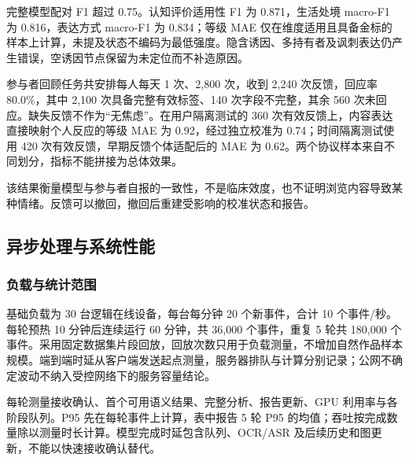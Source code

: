 完整模型配对 F1 超过 0.75。认知评价适用性 F1 为 0.871，生活处境 macro-F1 为 0.816，表达方式 macro-F1 为 0.834；等级 MAE 仅在维度适用且具备金标的样本上计算，未提及状态不编码为最低强度。隐含诱因、多持有者及讽刺表达仍产生错误，空诱因节点保留为未定位而不补造原因。

参与者回顾任务共安排每人每天 1 次、2,800 次，收到 2,240 次反馈，回应率 80.0\%，其中 2,100 次具备完整有效标签、140 次字段不完整，其余 560 次未回应。缺失反馈不作为``无焦虑''。在用户隔离测试的 360 次有效反馈上，内容表达直接映射个人反应的等级 MAE 为 0.92，经过独立校准为 0.74；时间隔离测试使用 420 次有效反馈，早期反馈个体适配后的 MAE 为 0.62。两个协议样本来自不同划分，指标不能拼接为总体效果。

该结果衡量模型与参与者自报的一致性，不是临床效度，也不证明浏览内容导致某种情绪。反馈可以撤回，撤回后重建受影响的校准状态和报告。

\subsection{异步处理与系统性能}\label{section:3.8}

\subsubsection{负载与统计范围}\label{section:3.8.1}

基础负载为 30 台逻辑在线设备，每台每分钟 20 个新事件，合计 10 个事件/秒。每轮预热 10 分钟后连续运行 60 分钟，共 36,000 个事件，重复 5 轮共 180,000 个事件。采用固定数据集片段回放，回放次数只用于负载测量，不增加自然作品样本规模。端到端时延从客户端发送起点测量，服务器排队与计算分别记录；公网不确定波动不纳入受控网络下的服务容量结论。

每轮测量接收确认、首个可用语义结果、完整分析、报告更新、GPU 利用率与各阶段队列。P95 先在每轮事件上计算，表中报告 5 轮 P95 的均值；吞吐按完成数量除以测量时长计算。模型完成时延包含队列、OCR/ASR 及后续历史和图更新，不能以快速接收确认替代。


